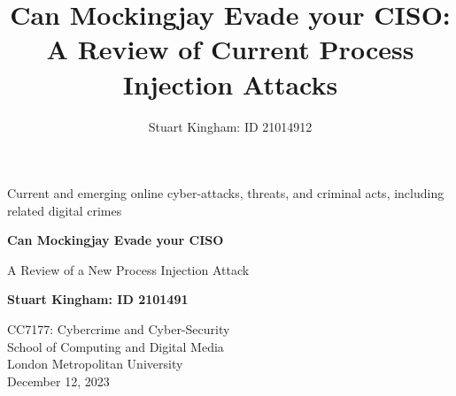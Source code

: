 \documentclass{article}
\title{Can Mockingjay Evade your CISO: A Review of Current Process Injection Attacks}
\author{Stuart Kingham: ID 21014912}
\begin{document}
\doublespacing



\begin{titlepage}
  \vspace*{\fill}
  \begin{center}
       \vspace*{1cm}

       {\LARGE Current and emerging online cyber-attacks, threats, and criminal acts, including related digital crimes}

       \vspace*{1cm}
       {\large \textbf{Can Mockingjay Evade your CISO}}
       
       \vspace{0.2cm}
       {\large A Review of a New Process Injection Attack}
            

       \vfill

       \textbf{Stuart Kingham: ID 2101491}

       \vfill
                        
       \vspace{0.8cm}
     

       CC7177: Cybercrime and Cyber-Security\\
       School of Computing and Digital Media\\
       London Metropolitan University\\
       December 12, 2023
            
  \end{center}
  \vspace*{\fill}
\end{titlepage}

\pagebreak
\end{document}
